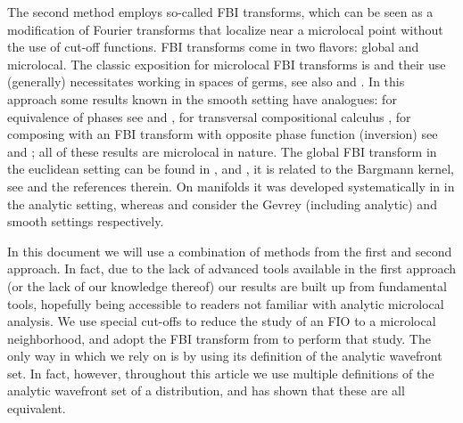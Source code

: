 \documentclass[
	fontsize=11pt, 
	twoside=false, 
	abstract=true, 
	a4paper,
]{scrartcl}
\begin{document}
The second method employs so-called FBI transforms, which can be seen as a modification of Fourier transforms that localize near a microlocal point without the use of cut-off functions. FBI transforms come in two flavors: global and microlocal. %
The classic exposition for microlocal FBI transforms is \cite{AST_1982__95__R3_0} and their use (generally) necessitates working in spaces of germs, see also \cite{zbMATH03719570,zbMATH00107787} and \cite[Part~VI]{MR4436039}. In this approach some results known in the smooth setting have analogues: for equivalence of phases see \cite[Thm.~11.17]{AST_1982__95__R3_0} and \cite[Thm.~22.3.13]{MR4436039}, for transversal compositional calculus \cite{zbMATH07292324}, for composing with an FBI transform with opposite phase function (inversion) see \cite[\S~4]{AST_1982__95__R3_0} and \cite[\S~21]{MR4436039}; all of these results are microlocal in nature. %
The global FBI transform in the euclidean setting can be found in \cite[Chp.~13]{zworski}, \cite[Chp.~3]{MR1872698} and \cite{MR1178557}, it is related to the Bargmann kernel, see \cite{zbMATH07292324} and the references therein. On manifolds it was developed systematically in \cite{zbMATH03717772,zbMATH00920878} in the analytic setting, whereas \cite{bonthonneau2020fbi} and \cite{zbMATH01549679} consider the Gevrey (including analytic) and smooth settings respectively. 

In this document we will use a combination of methods from the first and second approach. In fact, due to the lack of advanced tools available in the first approach (or the lack of our knowledge thereof) our results are built up from fundamental tools, hopefully being accessible to readers not familiar with analytic microlocal analysis. 
We use special cut-offs to reduce the study of an FIO to a microlocal neighborhood, and adopt the FBI transform from \cite{MR1872698} to perform that study. The only way in which we rely on \cite{AST_1982__95__R3_0} is by using its definition of the analytic wavefront set. In fact, however, throughout this article we use multiple definitions of the analytic wavefront set of a distribution, and \cite{SEDP_1976-1977____A3_0} has shown that these are all equivalent. 
\end{document}
